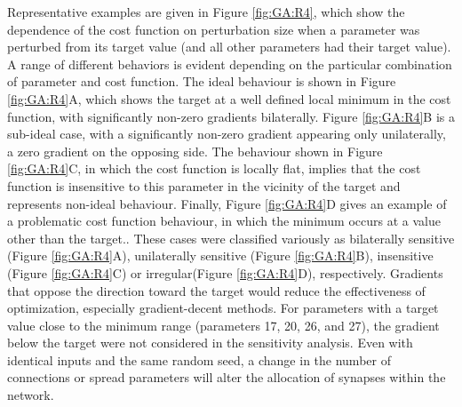 Representative examples are given in Figure \ref{fig:GA:R4}, which show
the dependence of the cost function on perturbation size when a
parameter was perturbed from its target value (and all other
parameters had their target value). A range of different behaviors is
evident depending on the particular combination of parameter and cost
function. The ideal behaviour is shown in Figure \ref{fig:GA:R4}A, which
shows the target at a well defined local minimum in the cost function,
with significantly non-zero gradients bilaterally. Figure
\ref{fig:GA:R4}B is a sub-ideal case, with a significantly non-zero
gradient appearing only unilaterally, a zero gradient on the opposing
side.  The behaviour shown in Figure \ref{fig:GA:R4}C, in which the cost
function is locally flat, implies that the cost function is
insensitive to this parameter in the vicinity of the target and
represents non-ideal behaviour. Finally, Figure \ref{fig:GA:R4}D gives an
example of a problematic cost function behaviour, in which the minimum
occurs at a value other than the target.. These cases were
classified variously as bilaterally sensitive (Figure \ref{fig:GA:R4}A),
unilaterally sensitive (Figure \ref{fig:GA:R4}B), insensitive (Figure
\ref{fig:GA:R4}C) or irregular(Figure \ref{fig:GA:R4}D), respectively.
Gradients that oppose the direction toward the target
would reduce the effectiveness of optimization, especially
gradient-decent methods.  For parameters with a target value close to
the minimum range (parameters 17, 20, 26, and 27), the gradient below
the target were not considered in the sensitivity analysis.  Even with
identical {\ANF} inputs and the same random seed, a change in the number
of connections or spread parameters will alter the allocation of
synapses within the network.



